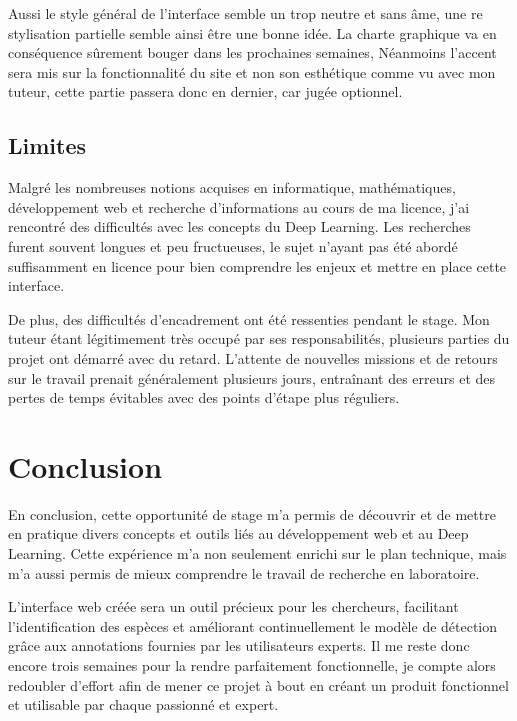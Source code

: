 \documentclass[
  10pt,
]{article}
\begin{document}
Aussi le style général de l'interface semble un trop neutre et sans âme,
une re stylisation partielle semble ainsi être une bonne idée. La charte
graphique va en conséquence sûrement bouger dans les prochaines
semaines, Néanmoins l'accent sera mis sur la fonctionnalité du site et
non son esthétique comme vu avec mon tuteur, cette partie passera donc
en dernier, car jugée optionnel.

\subsection{Limites}\label{limites}

Malgré les nombreuses notions acquises en informatique, mathématiques,
développement web et recherche d'informations au cours de ma licence,
j'ai rencontré des difficultés avec les concepts du Deep Learning. Les
recherches furent souvent longues et peu fructueuses, le sujet n'ayant
pas été abordé suffisamment en licence pour bien comprendre les enjeux
et mettre en place cette interface.

De plus, des difficultés d'encadrement ont été ressenties pendant le
stage. Mon tuteur étant légitimement très occupé par ses
responsabilités, plusieurs parties du projet ont démarré avec du retard.
L'attente de nouvelles missions et de retours sur le travail prenait
généralement plusieurs jours, entraînant des erreurs et des pertes de
temps évitables avec des points d'étape plus réguliers.

\newpage

\section{Conclusion}\label{conclusion}

En conclusion, cette opportunité de stage m'a permis de découvrir et de
mettre en pratique divers concepts et outils liés au développement web
et au Deep Learning. Cette expérience m'a non seulement enrichi sur le
plan technique, mais m'a aussi permis de mieux comprendre le travail de
recherche en laboratoire.

L'interface web créée sera un outil précieux pour les chercheurs,
facilitant l'identification des espèces et améliorant continuellement le
modèle de détection grâce aux annotations fournies par les utilisateurs
experts. Il me reste donc encore trois semaines pour la rendre
parfaitement fonctionnelle, je compte alors redoubler d'effort afin de
mener ce projet à bout en créant un produit fonctionnel et utilisable
par chaque passionné et expert.
\end{document}
